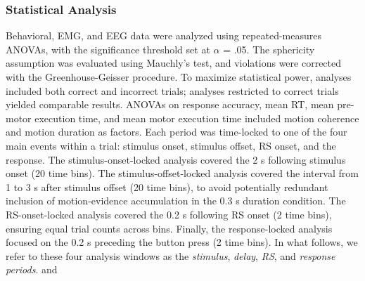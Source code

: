 


\subsubsection{Statistical Analysis}

Behavioral, EMG, and EEG data were analyzed using repeated-measures ANOVAs, with the significance threshold set at $\alpha$ = .05. The sphericity assumption was evaluated using Mauchly's test, and violations were corrected with the Greenhouse-Geisser procedure.  To maximize statistical power, analyses included  both correct and incorrect trials; analyses restricted to correct trials yielded  comparable results. ANOVAs on response accuracy, mean RT, mean pre-motor execution time, and mean motor execution time  included motion coherence and motion duration as factors.   Each period was time-locked to one of the four main events within a trial: stimulus onset, stimulus offset, RS onset, and the response. The stimulus-onset-locked analysis covered the 2  s following stimulus onset (20 time bins). The stimulus-offset-locked analysis covered the interval from 1 to 3 s after stimulus offset (20 time bins), to avoid potentially redundant inclusion of motion-evidence accumulation in the 0.3 s duration condition. The RS-onset-locked analysis covered the 0.2 s following RS onset (2 time bins), ensuring equal trial counts across bins. Finally, the response-locked analysis focused on the 0.2 s preceding the button press (2 time bins).  In what follows, we refer to these four analysis windows as the \emph{stimulus}, \emph{delay}, \emph{RS}, and \emph{response}  \emph{periods}.   and        

